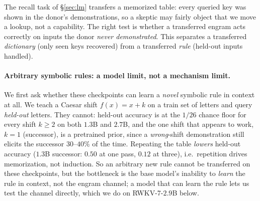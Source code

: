 \documentclass[11pt]{article}
\theoremstyle{definition}
\begin{document}
The recall task of \S\ref{sec:lm} transfers a memorized table: every queried key was shown in the donor's demonstrations, so a skeptic may fairly object that we move a lookup, not a capability. The right test is whether a transferred engram acts correctly on inputs the donor \emph{never demonstrated}. This separates a transferred \emph{dictionary} (only seen keys recovered) from a transferred \emph{rule} (held-out inputs handled).

\paragraph{Arbitrary symbolic rules: a model limit, not a mechanism limit.}
We first ask whether these checkpoints can learn a \emph{novel} symbolic rule in context at all. We teach a Caesar shift $f(x)=x{+}k$ on a train set of letters and query \emph{held-out} letters. They cannot: held-out accuracy is at the $1/26$ chance floor for every shift $k\ge 2$ on both $1.3$B and $2.7$B, and the one shift that appears to work, $k{=}1$ (successor), is a pretrained prior, since a \emph{wrong}-shift demonstration still elicits the successor $30$--$40\%$ of the time. Repeating the table \emph{lowers} held-out accuracy ($1.3$B successor: $0.50$ at one pass, $0.12$ at three), i.e.\ repetition drives memorization, not induction. So an arbitrary new rule cannot be transferred on these checkpoints, but the bottleneck is the base model's inability to \emph{learn} the rule in context, not the engram channel; a model that can learn the rule lets us test the channel directly, which we do on RWKV-7-$2.9$B below.
\end{document}
